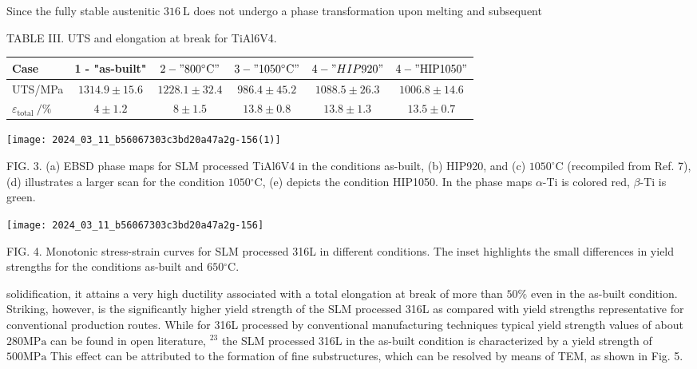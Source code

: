 \documentclass[10pt]{article}
\begin{document}
Since the fully stable austenitic $316 \mathrm{~L}$ does not undergo a phase transformation upon melting and subsequent

TABLE III. UTS and elongation at break for TiAl6V4.

\begin{center}
\begin{tabular}{lccccc}
\hline\hline
Case & 1 - "as-built" & $2-" 800{ }^{\circ} \mathrm{C} "$ & $3-" 1050{ }^{\circ} \mathrm{C} "$ & $4-" H I P 920 "$ & $4-" \mathrm{HIP} 1050 "$ \\
\hline
UTS/MPa & $1314.9 \pm 15.6$ & $1228.1 \pm 32.4$ & $986.4 \pm 45.2$ & $1088.5 \pm 26.3$ & $1006.8 \pm 14.6$ \\
$\varepsilon_{\text {total }} / \%$ & $4 \pm 1.2$ & $8 \pm 1.5$ & $13.8 \pm 0.8$ & $13.8 \pm 1.3$ & $13.5 \pm 0.7$ \\
\hline\hline
\end{tabular}
\end{center}

\begin{center}
\texttt{[image: 2024\_03\_11\_b56067303c3bd20a47a2g-156(1)]}
\end{center}

FIG. 3. (a) EBSD phase maps for SLM processed TiAl6V4 in the conditions as-built, (b) HIP920, and (c) $1050^{\circ} \mathrm{C}$ (recompiled from Ref. 7), (d) illustrates a larger scan for the condition $1050{ }^{\circ} \mathrm{C}$, (e) depicts the condition HIP1050. In the phase maps $\alpha$-Ti is colored red, $\beta$-Ti is green.

\begin{center}
\texttt{[image: 2024\_03\_11\_b56067303c3bd20a47a2g-156]}
\end{center}

FIG. 4. Monotonic stress-strain curves for SLM processed 316L in different conditions. The inset highlights the small differences in yield strengths for the conditions as-built and $650{ }^{\circ} \mathrm{C}$.

solidification, it attains a very high ductility associated with a total elongation at break of more than $50 \%$ even in the as-built condition. Striking, however, is the significantly higher yield strength of the SLM processed 316L as compared with yield strengths representative for conventional production routes. While for 316L processed by conventional manufacturing techniques typical yield strength values of about $280 \mathrm{MPa}$ can be found in open literature, ${ }^{23}$ the SLM processed 316L in the as-built condition is characterized by a yield strength of $500 \mathrm{MPa}$ This effect can be attributed to the formation of fine substructures, which can be resolved by means of TEM, as shown in Fig. 5.
\end{document}
